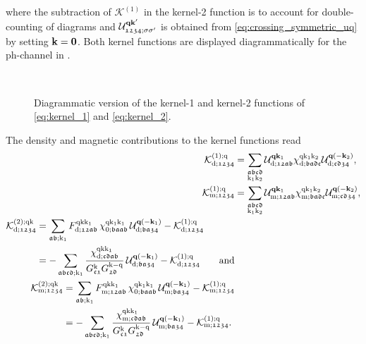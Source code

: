 \documentclass[../../main.tex]{subfiles}
\begin{document}
where the subtraction of $\mathcal{K}^{(1)}$ in the kernel-2 function is to account for double-counting of diagrams and $\mathcal{U}^{\textbf{qk}'}_{\mathfrak{1234};\sigma\sigma'}$ is obtained from \eqref{eq:crossing_symmetric_uq} by setting $\textbf{k}=\textbf{0}$. Both kernel functions are displayed diagrammatically for the ph-channel in .
\begin{figure}[ht!]
  \centering
  \subfloat{}\\[0.5cm]
  \hspace{-0.25cm}\subfloat{}
  \caption{Diagrammatic version of the kernel-1 and kernel-2 functions of \eqref{eq:kernel_1} and \eqref{eq:kernel_2}.}
  \label{fig:kernel_functions}
\end{figure}
The density and magnetic contributions to the kernel functions read
\begin{subequations}\label{eq:kernel_functions_dens_magn}
\begin{align}
	\mathcal{K}^{(1);\text{q}}_{\text{d};\mathfrak{1234}}&=\sum_{\substack{\mathfrak{abcd}\\\text{k}_1\text{k}_2}} \mathcal{U}^{\textbf{q}\textbf{k}_1}_{\text{d};\mathfrak{12ab}} \chi^{\text{q}\text{k}_1\text{k}_2}_{\text{d};\mathfrak{badc}} \mathcal{U}^{\textbf{q}(-\textbf{k}_2)}_{\text{d};\mathfrak{cd34}},\\
	\mathcal{K}^{(1);\text{q}}_{\text{m};\mathfrak{1234}}&=\sum_{\substack{\mathfrak{abcd}\\\text{k}_1\text{k}_2}} \mathcal{U}^{\textbf{q}\textbf{k}_1}_{\text{m};\mathfrak{12ab}} \chi^{\text{q}\text{k}_1\text{k}_2}_{\text{m};\mathfrak{badc}} \mathcal{U}^{\textbf{q}(-\textbf{k}_2)}_{\text{m};\mathfrak{cd34}},\\
\begin{split}
	\mathcal{K}^{(2);\text{q}\text{k}}_{\text{d};\mathfrak{1234}}&=\sum_{\mathfrak{ab};\text{k}_1} F^{\text{q}\text{k}\text{k}_1}_{\text{d};\mathfrak{12ab}}\,\chi^{\text{q}\text{k}_1\text{k}_1}_{0;\mathfrak{baab}}\,\mathcal{U}^{\textbf{q}(-\textbf{k}_1)}_{\text{d};\mathfrak{ba34}}-\mathcal{K}^{(1);\text{q}}_{\text{d};\mathfrak{1234}}\\
	&=-\sum_{\mathfrak{abcd};\text{k}_1} \frac{\chi^{\text{q}\text{k}\text{k}_1}_{\text{d};\mathfrak{cdab}}}{G^{\text{k}}_{\mathfrak{c1}}G^{\text{k}-\text{q}}_{\mathfrak{2d}}}\,\mathcal{U}^{\textbf{q}(-\textbf{k}_1)}_{\text{d};\mathfrak{ba34}}-\mathcal{K}^{(1);\text{q}}_{\text{d};\mathfrak{1234}}\qquad\text{and}
\end{split}\\
\begin{split}
	\mathcal{K}^{(2);\text{q}\text{k}}_{\text{m};\mathfrak{1234}}&=\sum_{\mathfrak{ab};\text{k}_1} F^{\text{q}\text{k}\text{k}_1}_{\text{m};\mathfrak{12ab}}\,\chi^{\text{q}\text{k}_1\text{k}_1}_{0;\mathfrak{baab}}\,\mathcal{U}^{\textbf{q}(-\textbf{k}_1)}_{\text{m};\mathfrak{ba34}}-\mathcal{K}^{(1);\text{q}}_{\text{m};\mathfrak{1234}}\\
	&=-\sum_{\mathfrak{abcd};\text{k}_1} \frac{\chi^{\text{q}\text{k}\text{k}_1}_{\text{m};\mathfrak{cdab}}}{G^{\text{k}}_{\mathfrak{c1}}G^{\text{k}-\text{q}}_{\mathfrak{2d}}}\,\mathcal{U}^{\textbf{q}(-\textbf{k}_1)}_{\text{m};\mathfrak{ba34}}-\mathcal{K}^{(1);\text{q}}_{\text{m};\mathfrak{1234}}.
\end{split}
\end{align}
\end{subequations}
\end{document}
